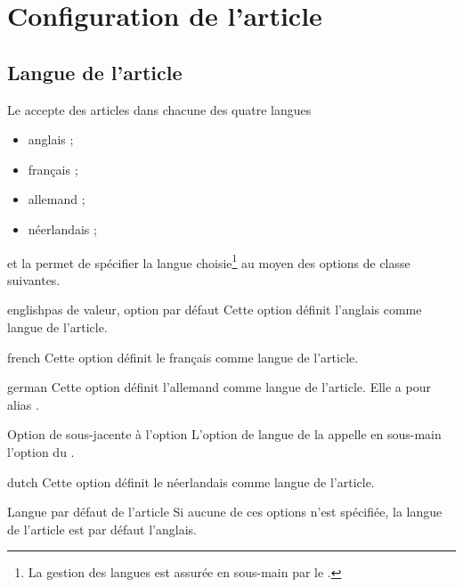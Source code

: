 \documentclass[french,nolocaltoc]{nwejmart}
\newtheorem[title=Fait,style=definition]{fact}
\begin{document}
\section{Configuration de l'article}

\subsection{Langue de l'article}
\label{sec:langue-de-larticle}

Le \nwejm{} accepte des articles dans chacune des quatre langues
\begin{itemize}
\item anglais ;
\item français ;
\item allemand ;
\item néerlandais ;
\end{itemize}
et la \nwejmauthorcl{} permet de spécifier la langue choisie\footnote{La gestion
  des langues est assurée en sous-main par le .} au moyen des
options de classe suivantes.

\begin{docKey}{english}{}{pas de valeur, option par défaut}
  Cette option définit l'anglais comme langue de l'article.
\end{docKey}
\begin{docKey}{french}{}{}
  Cette option définit le français comme langue de l'article.
\end{docKey}
\begin{docKey}{german}{}{}
  Cette option définit l'allemand comme langue de l'article. Elle a pour alias
  .
  \begin{dbremark}{Option de  sous-jacente à l'option
      \protect{}}{}
    L'option de langue  de la \nwejmauthorcl{} appelle en
    sous-main l'option  du .
  \end{dbremark}
  \begin{docKey}{dutch}{}{}
  Cette option définit le néerlandais comme langue de l'article.
\end{docKey}
\end{docKey}

\begin{dbremark}{Langue par défaut de l'article}{}
  Si aucune de ces options n'est spécifiée, la langue de l'article est par
  défaut l'anglais.
\end{dbremark}
\end{document}
